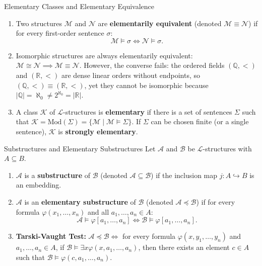\begin{definitionbox}{Elementary Classes and Elementary Equivalence}
\begin{enumerate}[leftmargin=1.4em,itemsep=2pt]
  \item Two structures $\mathcal{M}$ and $\mathcal{N}$ are \textbf{elementarily equivalent} (denoted $\mathcal{M} \equiv \mathcal{N}$) if for every first-order sentence $\sigma$:
  \[
  \mathcal{M} \models \sigma \iff \mathcal{N} \models \sigma.
  \]
  \item Isomorphic structures are always elementarily equivalent: $\mathcal{M} \cong \mathcal{N} \implies \mathcal{M} \equiv \mathcal{N}$.
  However, the converse fails: the ordered fields $(\mathbb{Q}, <)$ and $(\mathbb{R}, <)$ are dense linear orders without endpoints, so $(\mathbb{Q}, <) \equiv (\mathbb{R}, <)$, yet they cannot be isomorphic because $|\mathbb{Q}| = \aleph_0 \neq 2^{\aleph_0} = |\mathbb{R}|$.
  \item A class $\mathcal{K}$ of $\mathcal{L}$-structures is \textbf{elementary} if there is a set of sentences $\Sigma$ such that $\mathcal{K} = \mathrm{Mod}(\Sigma) = \{ \mathcal{M} \mid \mathcal{M} \models \Sigma \}$. If $\Sigma$ can be chosen finite (or a single sentence), $\mathcal{K}$ is \textbf{strongly elementary}.
\end{enumerate}
\end{definitionbox}

\begin{definitionbox}{Substructures and Elementary Substructures}
Let $\mathcal{A}$ and $\mathcal{B}$ be $\mathcal{L}$-structures with $A \subseteq B$.
\begin{enumerate}[leftmargin=1.4em,itemsep=2pt]
  \item $\mathcal{A}$ is a \textbf{substructure} of $\mathcal{B}$ (denoted $\mathcal{A} \subseteq \mathcal{B}$) if the inclusion map $j: A \hookrightarrow B$ is an embedding.
  \item $\mathcal{A}$ is an \textbf{elementary substructure} of $\mathcal{B}$ (denoted $\mathcal{A} \preceq \mathcal{B}$) if for every formula $\varphi(x_1, \dots, x_n)$ and all $a_1, \dots, a_n \in A$:
  \[
  \mathcal{A} \models \varphi[a_1, \dots, a_n] \iff \mathcal{B} \models \varphi[a_1, \dots, a_n].
  \]
  \item \textbf{Tarski-Vaught Test:} $\mathcal{A} \preceq \mathcal{B} \iff$ for every formula $\varphi(x, y_1, \dots, y_n)$ and $a_1, \dots, a_n \in A$, if $\mathcal{B} \models \exists x \varphi(x, a_1, \dots, a_n)$, then there exists an element $c \in A$ such that $\mathcal{B} \models \varphi(c, a_1, \dots, a_n)$.
\end{enumerate}
\end{definitionbox}

